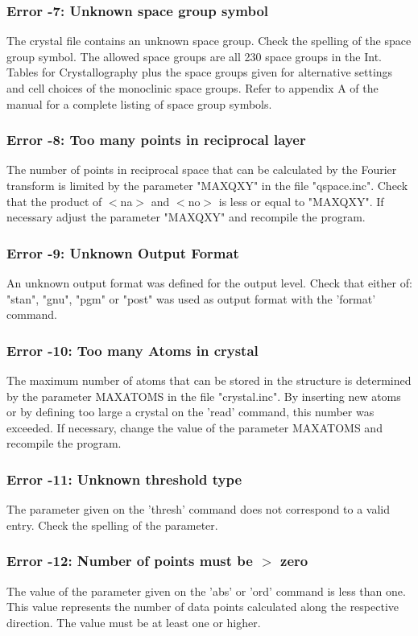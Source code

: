 \subsubsection{Error -7: Unknown space group symbol}
\par
The crystal file contains an unknown space group. Check the spelling of 
the space group symbol. The allowed space groups are all 230 space 
groups in the Int. Tables for Crystallography plus the space groups 
given for alternative settings and cell choices of the monoclinic 
space groups. 
Refer to appendix A of the manual for a complete listing of space 
group symbols. 
\subsubsection{Error -8: Too many points in reciprocal layer}
\par
The number of points in reciprocal space that can be calculated by the 
Fourier transform is limited by the parameter "MAXQXY" in the file 
"qspace.inc". Check that the product of $ <$na$> $ and $ <$no$> $ is less or equal 
to "MAXQXY". If necessary adjust the parameter "MAXQXY" and recompile 
the program. 
\subsubsection{Error -9: Unknown Output Format}
\par
An unknown output format was defined for the output level. Check 
that either of: "stan", "gnu", "pgm" or "post" was used as output 
format with the 'format' command. 
\subsubsection{Error -10: Too many Atoms in crystal}
\par
The maximum number of atoms that can be stored in the structure 
is determined by the parameter MAXATOMS in the file "crystal.inc". 
By inserting new atoms or by defining too large a crystal on the 
'read' command, this number was exceeded. If necessary, change the 
value of the parameter MAXATOMS and recompile the program. 
\subsubsection{Error -11: Unknown threshold type}
The parameter given on the 'thresh' command does not correspond to 
a valid entry. Check the spelling of the parameter. 
\subsubsection{Error -12: Number of points must be $> $ zero}
\par
The value of the parameter given on the 'abs' or 'ord' command is 
less than one. This value represents the number of data points 
calculated along the respective direction. 
The value must be at least one or higher. 

